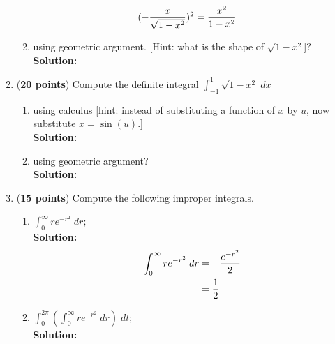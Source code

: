 \documentclass[a4paper]{article}
\begin{document}
\begin{enumerate}
\begin{enumerate}
	
\begin{align}
(-\frac{x}{\sqrt{1-x^2}})^2 &= \frac{x^2}{1 - x^2}\notag
\end{align}	
	
	
	\item using geometric argument. [Hint: what is the shape of $\sqrt{1-x^2}$]?\\
	\textbf{Solution:}\\
	
	
\end{enumerate}



\item (\textbf{20 points}) Compute the definite integral $\int_{-1}^1\sqrt{1-x^2} \; dx$


\begin{enumerate}
	\item using calculus [hint: instead of substituting a function of $x$ by $u$, now substitute $x = \sin(u)$.]\\
	\textbf{Solution:}\\
	
	\item using geometric argument?\\
	\textbf{Solution:}\\
	
	
\end{enumerate}




\item (\textbf{15 points}) Compute the following improper integrals.


\begin{enumerate}
	\item $\int_0^\infty re^{-r^2} \; dr;$\\
	\textbf{Solution:}\\

\begin{align}
\int_0^\infty re^{-r^2} \; dr &= -\frac{e^{-r^2}}{2}\notag\\
&= \frac{1}{2}\notag
\end{align}

	
	\item $\int_0^{2\pi} (\int_0^\infty re^{-r^2} \; dr)\; dt;$\\
	\textbf{Solution:}\\
	

\end{enumerate}
\end{enumerate}
\end{document}
